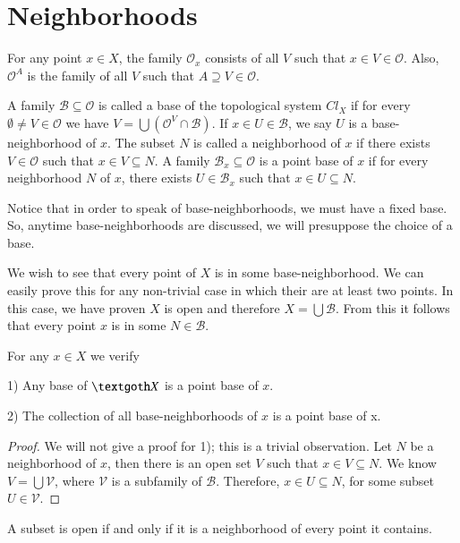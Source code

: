 \documentclass [12pt]{book}
\begin{document}
\section{Neighborhoods}For any point $x\in X$, the family $\mathcal{O}_{x}$ consists of all $V$ such that $x\in V\in\mathcal{O}$. Also, $\mathcal{O}^{A}$ is the family of all $V$ such that $A\supseteq V\in\mathcal{O}$.

\begin{definition}A family $\mathcal{B}\subseteq\mathcal{O}$ is called a base of the topological system $Cl_X$ if for every $\emptyset\neq V\in\mathcal{O}$ we have $V=\bigcup(\mathcal{O}^V\cap\mathcal{B})$. If $x\in U\in\mathcal{B}$, we say $U$ is a base-neighborhood of $x$. The subset $N$ is called a neighborhood of $x$ if there exists $V\in\mathcal{O}$ such that $x\in V\subseteq N$. A family $\mathcal{B}_{x}\subseteq\mathcal{O}$ is a point base of $x$ if for every neighborhood $N$ of $x$, there exists $U\in\mathcal{B}_{x}$ such that $x\in U\subseteq N$.\end{definition}

Notice that in order to speak of base-neighborhoods, we must have a fixed  base. So, anytime base-neighborhoods are discussed, we will presuppose the choice of a base. 

We wish to see that every point of $X$ is in some base-neighborhood. We can easily prove this for any non-trivial case in which their are at least two points. In this case, we have proven $X$ is open and therefore $X=\bigcup\mathcal{B}$. From this it follows that every point $x$ is in some $N\in\mathcal{B}$.

\begin{proposition}For any $x\in X$ we verify

\item[1)]Any base of $\textgoth X$ is a point base of $x$.\item[2)]The collection of all base-neighborhoods of $x$ is a point base of x.\end{proposition}

\begin{proof}We will not give a proof for 1); this is a trivial observation. Let $N$ be a neighborhood of $x$, then there is an open set $V$ such that $x\in V\subseteq N$. We know $V=\bigcup\mathcal{V}$, where $\mathcal{V}$ is a subfamily of $\mathcal{B}$. Therefore, $x\in U\subseteq N$, for some subset $U\in\mathcal{V}$.\end{proof}

\begin{theorem}A subset is open if and only if it is a neighborhood of every point it contains.\end{theorem}
\end{document}
